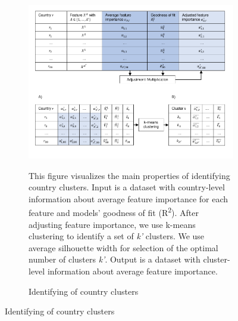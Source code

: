 \begin{figure}[ht!]\ContinuedFloat
   \begin{subfigure}[b]{\textwidth}
  \centering
  \includegraphics{1_Figures/Figures_Appendix/Graphical representation of data work_3.pdf}
  \caption{Identifying of country clusters} \label{fig:data_visualisation_3}
  \begin{subcaption2}
    This figure visualizes the main properties of identifying country clusters. Input is a dataset with country-level information about average feature importance for each feature and models' goodness of fit (R\textsuperscript{2}). After adjusting feature importance, we use k-means clustering to identify a set of \textit{k'} clusters. We use average silhouette width for selection of the optimal number of clusters \textit{k'}. Output is a dataset with cluster-level information about average feature importance.
  \end{subcaption2}
\end{subfigure}
\end{figure}